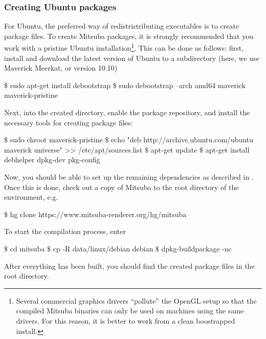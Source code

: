 \subsubsection{Creating Ubuntu packages}
For Ubuntu, the preferred way of redistristributing executables is to create
 package files. To create Mitsuba packages, it is strongly recommended
that you work with a pristine Ubuntu installation\footnote{Several commercial graphics 
drivers ``pollute'' the OpenGL setup so that the compiled Mitsuba binaries 
can only be used on machines using the same drivers. For this reason, it is 
better to work from a clean boostrapped install.}. This can be done as follows:
first, install  and download the latest version of Ubuntu
to a subdirectory (here, we use Maverick Meerkat, or version 10.10)
\begin{shell}
$\text{\$}$ sudo apt-get install debootstrap
$\text{\$}$ sudo debootstrap --arch amd64 maverick maverick-pristine
\end{shell}
Next,  into the created directory, enable the  package repository,
and install the necessary tools for creating package files:
\begin{shell}
$\text{\$}$ sudo chroot maverick-pristine
$\text{\$}$ echo "deb http://archive.ubuntu.com/ubuntu maverick universe" >> /etc/apt/sources.list
$\text{\$}$ apt-get update
$\text{\$}$ apt-get install debhelper dpkg-dev pkg-config
\end{shell}
Now, you should be able to set up the remaining dependencies as described in .
Once this is done, check out a copy of Mitsuba to the root directory of the  environment, e.g.
\begin{shell}
$\text{\$}$ hg clone https://www.mitsuba-renderer.org/hg/mitsuba
\end{shell}
To start the compilation process, enter
\begin{shell}
$\text{\$}$ cd mitsuba
$\text{\$}$ cp -R data/linux/debian debian
$\text{\$}$ dpkg-buildpackage -nc
\end{shell}
After everything has been built, you should find the created package files
in the root directory.
